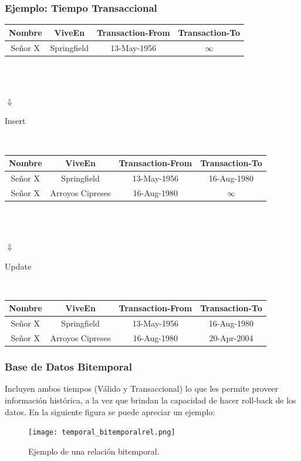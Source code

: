 \documentclass[a4paper,12pt,oneside]{report}
\begin{document}
\subsubsection*{Ejemplo: Tiempo Transaccional}
\begin{center}
\begin{tabular}{|c|c|c|c|}
\hline
Nombre & ViveEn & Transaction-From & Transaction-To\\
\hline
Se\~nor X & Springfield & 13-May-1956 & $\infty$\\
\hline
\end{tabular}
\\
\ \\
\begin{Huge}{$\Downarrow$}\end{Huge}\begin{small}{Insert}\end{small}\\
\begin{tabular}{|c|c|c|c|}
\hline
Nombre & ViveEn & Transaction-From & Transaction-To\\
\hline
Se\~nor X & Springfield & 13-May-1956 & 16-Aug-1980\\
\hline
Se\~nor X & Arroyos Cipreses & 16-Aug-1980 & $\infty$\\
\hline
\end{tabular}
\\
\ \\
\begin{Huge}{$\Downarrow$}\end{Huge}\begin{small}{Update}\end{small}\\
\begin{tabular}{|c|c|c|c|}
\hline
Nombre & ViveEn & Transaction-From & Transaction-To\\
\hline
Se\~nor X & Springfield & 13-May-1956 & 16-Aug-1980\\
\hline
Se\~nor X & Arroyos Cipreses & 16-Aug-1980 & 20-Apr-2004\\
\hline
\end{tabular}

\end{center}



\subsubsection*{Base de Datos Bitemporal}
Incluyen ambos tiempos (V\'alido y Transaccional) lo que les permite proveer informaci\'on hist\'orica, a la vez que brindan la capacidad de hacer roll-back de los datos. En la siguiente figura se puede apreciar un ejemplo:
\begin{figure}[h]
\center \texttt{[image: temporal\_bitemporalrel.png]}
\caption{Ejemplo de una relaci\'on bitemporal.}
\end{figure}
\end{document}
